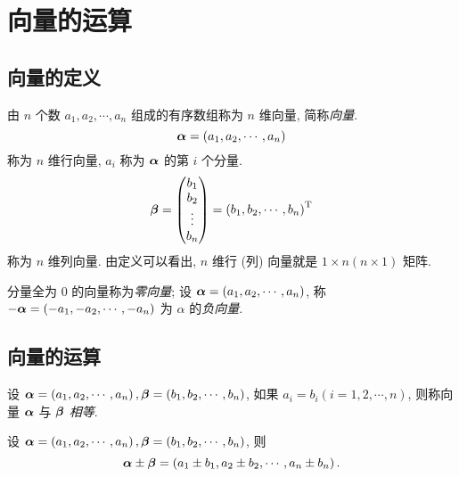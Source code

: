 \section{向量的运算}

\subsection{向量的定义}

\begin{definition}[向量的定义]
    由 $ n $ 个数 $ a_{1}, a_{2}, \cdots, a_{n} $ 组成的有序数组称为 $ n $ 维向量, 简称\textit{向量}.
    $$\vb*{\alpha}=\left(a_{1}, a_{2}, \cdots, a_{n}\right)$$
    称为 $ n $ 维行向量, $ a_{i} $ 称为 $ \vb*{\alpha} $ 的第 $ i $ 个分量.
    $$\vb*{\beta}=\mqty(b_{1} \\
        b_{2} \\
        \vdots \\
        b_{n})=\left(b_{1}, b_{2}, \cdots, b_{n}\right)^{\mathrm{T}}$$
    称为 $ n $ 维列向量.
    由定义可以看出, $ n $ 维行 (列) 向量就是 $ 1 \times n(n \times 1) $ 矩阵.
\end{definition}

\begin{definition}[零向量与负向量]
    分量全为 $0$ 的向量称为\textit{零向量}; 设 $ \vb*{\alpha}=\left(a_{1}, a_{2}, \cdots, a_{n}\right)$, 称 $ -\vb*{\alpha}=\left(-a_{1},-a_{2}, \cdots,-a_{n}\right)$ 为 $ \alpha $ 的\textit{负向量}.
\end{definition}

\subsection{向量的运算}

\begin{definition}[向量的相等]
    设 $ \vb*{\alpha}=\left(a_{1}, a_{2}, \cdots, a_{n}\right), \vb*{\beta}=\left(b_{1}, b_{2}, \cdots, b_{n}\right) $, 如果 $ a_{i}=b_{i}(i=1,2, \cdots, n) $, 则称向量 $ \vb*{\alpha} $ 与 $ \vb*{\beta} $ \textit{相等}.
\end{definition}

\begin{definition}[向量的加减]
    设 $ \vb*{\alpha}=\left(a_{1}, a_{2}, \cdots, a_{n}\right), \vb*{\beta}=\left(b_{1}, b_{2}, \cdots, b_{n}\right) $, 则 $$ \vb*{\alpha} \pm \vb*{\beta}=\left(a_{1} \pm b_{1}, a_{2} \pm b_{2}, \cdots, a_{n} \pm b_{n}\right) .$$
\end{definition}

